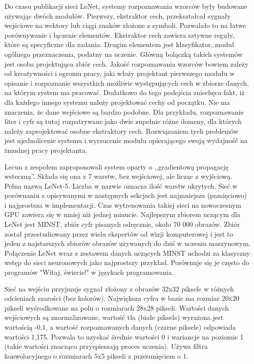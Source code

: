 \documentclass[12pt,a4paper,twoside,titlepage,openright]{book}
\begin{document}
\begin{itemize}
Do czasu publikacji sieci LeNet, systemy rozpoznawania wzorców były budowane używając dwóch modułów. Pierwszy, ekstraktor cech, przekształcał sygnały wejściowe na wektory lub ciągi znaków złożone z symboli. Pozwalało to na łatwe porównywanie i łączenie elementów. Ekstraktor cech zawiera sztywne reguły, które są specyficzne dla zadania. Drugim elementem jest klasyfikator, moduł ogólnego przeznaczenia, podatny na uczenie. Główną bolączką takich systemów jest osoba projektująca zbiór cech. Jakość rozpoznawania wzorców bowiem zależy od kreatywności i ogromu pracy, jaki włoży projektant pierwszego modułu w opisanie i rozpoznanie wszystkich możliwie występujących cech w zbiorze danych, na którym system ma pracować. Dodatkowo do tego podejścia zniechęca fakt, iż dla każdego innego systemu należy projektować cechy od początku. Nie ma znaczenia, że dane wejściowe są bardzo podobne. Dla przykładu, rozpoznawanie liter i cyfr są tutaj rozpatrywane jako dwie zupełnie różne domeny, dla których należy zaprojektować osobne ekstraktory cech. Rozwiązaniem tych problemów jest ujednolicenie systemu i wyrzucenie modułu opierającego swoją wydajność na żmudnej pracy projektanta.

Lecun z zespołem zaproponowali system oparty o ,,gradientową propagację wsteczną''. Składa się ona z 7 warstw, bez wejściowej, ale licząc z wyjściową. Pełna nazwa LeNet-5. Liczba w nazwie oznacza ilość warstw ukrytych. Sieć w porównaniu z opisywanymi w następnych sekcjach jest najmniejsza (pamięciowo) i najprostsza w implementacji. Czas wytrenowania takiej sieci na nowoczesnym GPU zawiera się w mniej niż jednej minucie. Najlepszym zbiorem uczącym dla LeNet jest MINST, zbiór cyfr pisanych odręcznie, około 70 000 obrazów. Zbiór został przestudiowany przez wielu ekspertów od wizji komputerowej i jest to jeden z najstarszych zbiorów obrazów używanych do dziś w uczeniu maszynowym. Połączenie LeNet wraz z zestawem danych uczących MINST uchodzi za klasyczny wstęp do sieci neuronowych jako najprostszy przykład. Porównuje się je często do programów "Witaj, świecie!" w językach programowania.

Sieć na wejściu przyjmuje sygnał złożony z obrazów 32x32 piksele w różnych odcieniach szarości (bez kolorów). Największa cyfra w bazie ma rozmiar 20x20 pikseli wyśrodkowane na polu o rozmiarach 28x28 pikseli. Wartości danych wejściowych są znormalizowane, wartość tła (białe piksele) wyrażona jest wartością -0,1, a wartość rozpoznawanych danych (czarne piksele) odpowiada wartości 1,175. Pozwala to uzyskać średnie wartości 0 i wariancje na poziomie 1 (takie wartości znacząco przyspieszają proces uczenia). Używa filtra konwolucyjnego o rozmiarach 5x5 pikseli z przesunięciem o 1.


\end{itemize}
\end{document}
